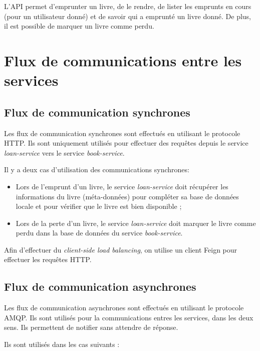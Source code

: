 \documentclass[
  french,
  a4paper,
]{scrartcl}
\begin{document}
L'API permet d'emprunter un livre, de le rendre, de lister les emprunts en cours (pour un utilisateur donné)
et de savoir qui a emprunté un livre donné. De plus, il est possible de marquer un livre comme perdu. 


\section{Flux de communications entre les services}

\subsection{Flux de communication synchrones}

Les flux de communication synchrones sont effectués en utilisant le protocole HTTP. Ils sont 
uniquement utilisés pour effectuer des requêtes depuis le service \textit{loan-service} vers le service
\textit{book-service}. 

Il y a deux cas d'utilisation des communications synchrones:

\begin{itemize}
  \item Lors de l'emprunt d'un livre, le service \textit{loan-service} doit récupérer 
    les informations du livre (méta-données) pour compléter sa base de données locale et pour 
    vérifier que le livre est bien disponible ; 

  \item Lors de la perte d'un livre, le service \textit{loan-service} doit marquer le livre
    comme perdu dans la base de données du service \textit{book-service}.
\end{itemize}

Afin d'effectuer du \textit{client-side load balancing}, on utilise un client Feign pour effectuer
les requêtes HTTP.

\subsection{Flux de communication asynchrones}

Les flux de communication asynchrones sont effectués en utilisant le protocole AMQP. Ils sont
utilisés pour la communications entres les services, dans les deux sens. Ils permettent 
de notifier sans attendre de réponse. 

Ils sont utilisés dans les cas suivants : 
\end{document}
